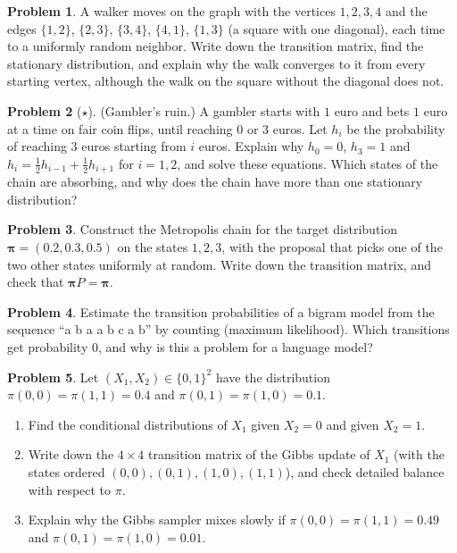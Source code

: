 \documentclass[11pt]{article}
\theoremstyle{definition}
\newtheorem{problem}{Problem}[section]
\begin{document}
\begin{problem}\label{pr:graph-walk}
    A walker moves on the graph with the vertices $1, 2, 3, 4$ and the edges $\{1, 2\}$, $\{2, 3\}$, $\{3, 4\}$, $\{4, 1\}$, $\{1, 3\}$ (a square with one diagonal), each time to a uniformly random neighbor. Write down the transition matrix, find the stationary distribution, and explain why the walk converges to it from every starting vertex, although the walk on the square without the diagonal does not.
\end{problem}

\begin{problem}[$\star$]\label{pr:gamblers-ruin}
    (Gambler's ruin.) A gambler starts with $1$ euro and bets $1$ euro at a time on fair coin flips, until reaching $0$ or $3$ euros. Let $h_i$ be the probability of reaching $3$ euros starting from $i$ euros. Explain why $h_0 = 0$, $h_3 = 1$ and $h_i = \frac{1}{2}h_{i-1} + \frac{1}{2}h_{i+1}$ for $i = 1, 2$, and solve these equations. Which states of the chain are absorbing, and why does the chain have more than one stationary distribution?
\end{problem}

\begin{problem}\label{pr:metropolis}
    Construct the Metropolis chain for the target distribution $\boldsymbol{\pi} = (0.2, 0.3, 0.5)$ on the states $1, 2, 3$, with the proposal that picks one of the two other states uniformly at random. Write down the transition matrix, and check that $\boldsymbol{\pi}P = \boldsymbol{\pi}$.
\end{problem}

\begin{problem}\label{pr:bigram}
    Estimate the transition probabilities of a bigram model from the sequence ``a b a a b c a b'' by counting (maximum likelihood). Which transitions get probability $0$, and why is this a problem for a language model?
\end{problem}

\begin{problem}\label{pr:gibbs-practice}
    Let $(X_1, X_2) \in \{0, 1\}^2$ have the distribution $\pi(0, 0) = \pi(1, 1) = 0.4$ and $\pi(0, 1) = \pi(1, 0) = 0.1$.
    \begin{enumerate}[label=(\alph*)]
        \item Find the conditional distributions of $X_1$ given $X_2 = 0$ and given $X_2 = 1$.
        \item Write down the $4 \times 4$ transition matrix of the Gibbs update of $X_1$ (with the states ordered $(0, 0), (0, 1), (1, 0), (1, 1)$), and check detailed balance with respect to $\pi$.
        \item Explain why the Gibbs sampler mixes slowly if $\pi(0, 0) = \pi(1, 1) = 0.49$ and $\pi(0, 1) = \pi(1, 0) = 0.01$.
    \end{enumerate}
\end{problem}
\end{document}
